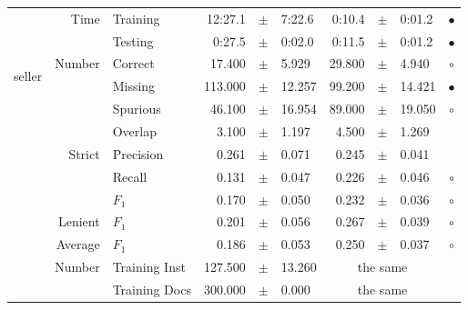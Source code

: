 \begin{longtable}{|r|r|l||rcl|rcl|c|}
\cline{2-10} & \multirow{2}{*}{      Time} &        Training &     12:27.1 &  $\pm$  &      7:22.6 &      0:10.4 &  $\pm$  &      0:01.2 & $\bullet$ \\
\cline{3-10} &                             &         Testing &      0:27.5 &  $\pm$  &      0:02.0 &      0:11.5 &  $\pm$  &      0:01.2 & $\bullet$ \\
\hline
\hline
\multirow{11}{*}{\begin{sideways}seller\end{sideways} }
             & \multirow{4}{*}{    Number} &         Correct &      17.400 &  $\pm$  &       5.929 &      29.800 &  $\pm$  &       4.940 & $\circ$ \\
\cline{3-10} &                             &         Missing &     113.000 &  $\pm$  &      12.257 &      99.200 &  $\pm$  &      14.421 & $\bullet$ \\
\cline{3-10} &                             &        Spurious &      46.100 &  $\pm$  &      16.954 &      89.000 &  $\pm$  &      19.050 & $\circ$ \\
\cline{3-10} &                             &         Overlap &       3.100 &  $\pm$  &       1.197 &       4.500 &  $\pm$  &       1.269 &  \\
\cline{2-10} & \multirow{3}{*}{    Strict} &       Precision &       0.261 &  $\pm$  &       0.071 &       0.245 &  $\pm$  &       0.041 &  \\
\cline{3-10} &                             &          Recall &       0.131 &  $\pm$  &       0.047 &       0.226 &  $\pm$  &       0.046 & $\circ$ \\
\cline{3-10} &                             &           $F_1$ &       0.170 &  $\pm$  &       0.050 &       0.232 &  $\pm$  &       0.036 & $\circ$ \\
\cline{2-10} &                     Lenient &           $F_1$ &       0.201 &  $\pm$  &       0.056 &       0.267 &  $\pm$  &       0.039 & $\circ$ \\
\cline{2-10} &                     Average &           $F_1$ &       0.186 &  $\pm$  &       0.053 &       0.250 &  $\pm$  &       0.037 & $\circ$ \\
\cline{2-10} & \multirow{2}{*}{    Number} &   Training Inst &     127.500 &  $\pm$  &      13.260 &    \multicolumn{3}{c|}{the same}         &  \\
\cline{3-10} &                             &   Training Docs &     300.000 &  $\pm$  &       0.000 &    \multicolumn{3}{c|}{the same}         &  \\

\end{longtable}
